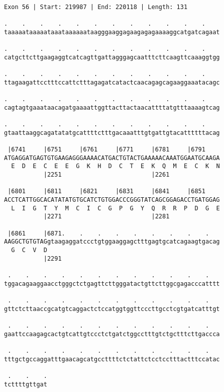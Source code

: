 \documentclass{article}
\begin{document}
\begin{Verbatim}
Exon 56 | Start: 219987 | End: 220118 | Length: 131
 
.    .    .    .    .    .    .    .    .    .    .    .    
taaaaataaaaataaataaaaaataagggaaggagaagagagaaaaggcatgatcagaat
  
.    .    .    .    .    .    .    .    .    .    .    .    
catgcttcttgaagaggtcatcagttgattagggagcaatttcttcaagttcaaaggtgg
  
.    .    .    .    .    .    .    .    .    .    .    .    
ttagaagattcctttccattctttagagatcatactcaacagagcagaaggaaatacagc
  
.    .    .    .    .    .    .    .    .    .    .    .    
cagtagtgaaataacagatgaaaattggttacttactaacattttatgtttaaaagtcag
  
.    .    .    .    .    .    .    .    .    .    .    .    
gtaattaaggcagatatatgcattttctttgacaaatttgtgattgtacattttttacag
  
 |6741     |6751     |6761     |6771     |6781     |6791    
ATGAGGATGAGTGTGAAGAGGGAAAACATGACTGTACTGAAAAACAAATGGAATGCAAGA
  E  D  E  C  E  E  G  K  H  D  C  T  E  K  Q  M  E  C  K  N
           |2251                         |2261              
  
 |6801     |6811     |6821     |6831     |6841     |6851    
ACCTCATTGGCACATATATGTGCATCTGTGGACCCGGGTATCAGCGGAGACCTGATGGAG
  L  I  G  T  Y  M  C  I  C  G  P  G  Y  Q  R  R  P  D  G  E
           |2271                         |2281              
  
 |6861     |6871.    .    .    .    .    .    .    .    .   
AAGGCTGTGTAGgtaagaggatccctgtggaaggagctttgagtgcatcagaagtgacag
  G  C  V  D                                                
           |2291                                            
  
 .    .    .    .    .    .    .    .    .    .    .    .   
tggacagaaggaacctgggctctgagttcttgggatactgttcttggcgagacccatttt
  
 .    .    .    .    .    .    .    .    .    .    .    .   
gttctcttaaccgcatgtcaggactctccatggtggttcccttgcctcgtgatcatttgt
  
 .    .    .    .    .    .    .    .    .    .    .    .   
gaattccaagagcactgtcattgtccctctgatctggcctttgtctgctttcttgaccca
  
 .    .    .    .    .    .    .    .    .    .    .    .   
tttgctgccaggatttgaacagcatgccttttctctattctcctcctttactttccatac
  
 .    .    .
tcttttgttgat
\end{Verbatim}
\newpage
\end{document}
